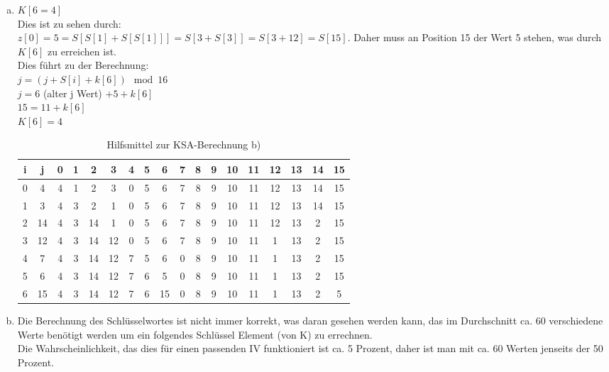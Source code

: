 \documentclass[12pt.twoside,a4paper,notitlepage]{article}
\begin{document}
\begin{enumerate}[a)]
\item $K[6=4]$\\
Dies ist zu sehen durch: \\
$z[0]=5=S[S[1]+S[S[1]]]=S[3+S[3]]=S[3+12]=S[15]$. Daher muss an Position 15 der Wert 5 stehen, was durch $K[6]$ zu 
erreichen ist.\\
Dies führt zu der Berechnung: \\
$j = (j + S[i] + k[6]) \mod 16 $\\
$j = 6 $ (alter j Wert) $+ 5 + k[6]$ \\
$15 = 11 + k[6]$\\
$K[6] = 4 $
\begin{table}[h]
\centering
\begin{tabular}{|c|c||c|c|c|c|c|c|c|c|c|c|c|c|c|c|c|c|}
\hline
i & j & 0 & 1 & 2 & 3 & 4 & 5 & 6 & 7 & 8 & 9 & 10 & 11 & 12 & 13 & 14 & 15 \\
\hline
0 & 4 & 4 & 1 & 2 & 3 & 0 & 5 & 6 & 7 & 8 & 9 & 10 & 11 & 12 & 13 & 14 & 15 \\
\hline
1 & 3 & 4 & 3 & 2 & 1 & 0 & 5 & 6 & 7 & 8 & 9 & 10 & 11 & 12 & 13 & 14 & 15 \\
\hline
2 & 14 & 4 & 3 & 14 & 1 & 0 & 5 & 6 & 7 & 8 & 9 & 10 & 11 & 12 & 13 & 2 & 15 \\
\hline
3 & 12 & 4 & 3 & 14 & 12 & 0 & 5 & 6 & 7 & 8 & 9 & 10 & 11 & 1 & 13 & 2 & 15 \\
\hline
4 & 7 & 4 & 3 & 14 & 12 & 7 & 5 & 6 & 0 & 8 & 9 & 10 & 11 & 1 & 13 & 2 & 15 \\
\hline
5 & 6 & 4 & 3 & 14 & 12 & 7 & 6 & 5 & 0 & 8 & 9 & 10 & 11 & 1 & 13 & 2 & 15 \\
\hline
6 & 15 & 4 & 3 & 14 & 12 & 7 & 6 & 15 & 0 & 8 & 9 & 10 & 11 & 1 & 13 & 2 & 5 \\
\hline
\end{tabular}
\caption{Hilfsmittel zur KSA-Berechnung b)}
\label{tab:ksb}
\end{table}

\item %

Die Berechnung des Schlüsselwortes ist nicht immer korrekt, was daran gesehen werden kann, das im Durchschnitt ca. 60
verschiedene Werte benötigt werden um ein folgendes Schlüssel Element (von K) zu errechnen.\\
Die Wahrscheinlichkeit, das dies für einen passenden IV funktioniert ist ca. 5 Prozent, daher ist man mit ca. 60 Werten jenseits der 50 Prozent.\\

\end{enumerate}
\end{document}
